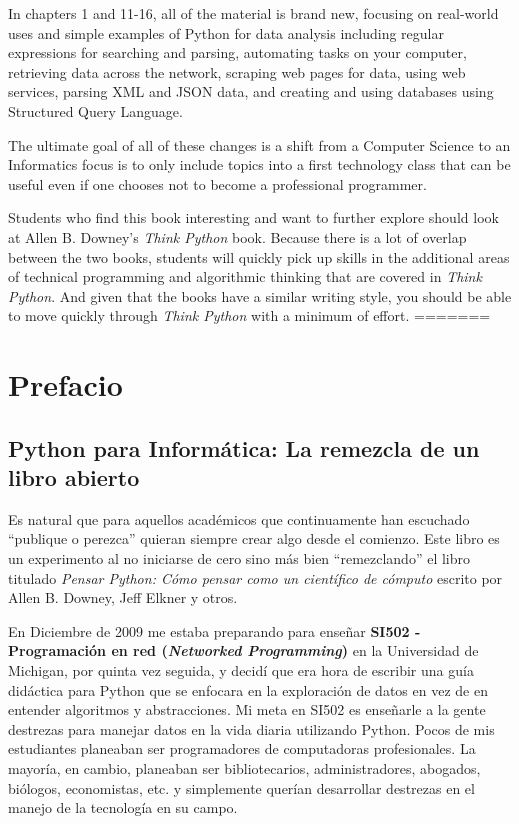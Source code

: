 In chapters 1 and 11-16, all of the material is brand new, focusing
on real-world uses and simple examples of Python for data analysis 
including regular expressions for searching and parsing, 
automating tasks on your computer, retrieving data across 
the network, scraping web pages for data, 
using web services, parsing XML and JSON data, and creating 
and using databases using Structured Query Language.

The ultimate goal of all of these changes is a shift from a 
Computer Science to an Informatics
focus is to only include topics into a first technology 
class that can be useful even if one chooses not to 
become a professional programmer.

Students who find this book interesting and want to further explore
should look at Allen B. Downey's \emph{Think Python} book.  Because there
is a lot of overlap between the two books,
students will quickly pick up skills in the additional
areas of technical programming and algorithmic thinking 
that are covered in \emph{Think Python}.
And given that the books have a similar writing style, you should be 
able to move quickly through \emph{Think Python} with a minimum of effort.
=======
\chapter{Prefacio}

\section*{Python para Inform\'atica: La remezcla de un libro abierto}

Es natural que para aquellos acad\'emicos que continuamente han escuchado ``publique o perezca'' quieran siempre crear algo desde el comienzo. Este libro es  un 
experimento al no iniciarse de cero sino m\'as bien ``remezclando''
el libro titulado
\emph{Pensar Python: C\'omo pensar como un cient\'ifico de c\'omputo}
escrito por Allen B. Downey, Jeff Elkner y otros.

En Diciembre de 2009 me estaba preparando para ense\~nar
{\bf SI502 - Programaci\'on en red (\textit{Networked Programming})} en la Universidad de Michigan,
por quinta vez seguida, y decid\'i que era hora de escribir una gu\'ia did\'actica para Python que se enfocara en la exploraci\'on de datos en vez de en entender algoritmos y abstracciones.
Mi meta en SI502 es ense\~narle a la gente destrezas para manejar datos en la vida diaria utilizando Python. Pocos de mis estudiantes planeaban ser programadores de computadoras profesionales. La mayor\'ia, en cambio, planeaban ser bibliotecarios, administradores, abogados, bi\'ologos, economistas, etc. y simplemente quer\'ian desarrollar destrezas en el manejo de la tecnolog\'ia en su campo.

